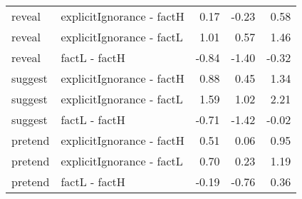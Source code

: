 \begin{longtable}{llrrr}
  reveal & explicitIgnorance - factH & 0.17 & -0.23 & 0.58 \\ 
  reveal & explicitIgnorance - factL & 1.01 & 0.57 & 1.46 \\ 
  reveal & factL - factH & -0.84 & -1.40 & -0.32 \\ 
  suggest & explicitIgnorance - factH & 0.88 & 0.45 & 1.34 \\ 
  suggest & explicitIgnorance - factL & 1.59 & 1.02 & 2.21 \\ 
  suggest & factL - factH & -0.71 & -1.42 & -0.02 \\ 
  pretend & explicitIgnorance - factH & 0.51 & 0.06 & 0.95 \\ 
  pretend & explicitIgnorance - factL & 0.70 & 0.23 & 1.19 \\ 
  pretend & factL - factH & -0.19 & -0.76 & 0.36 \\ 
  \end{longtable}

